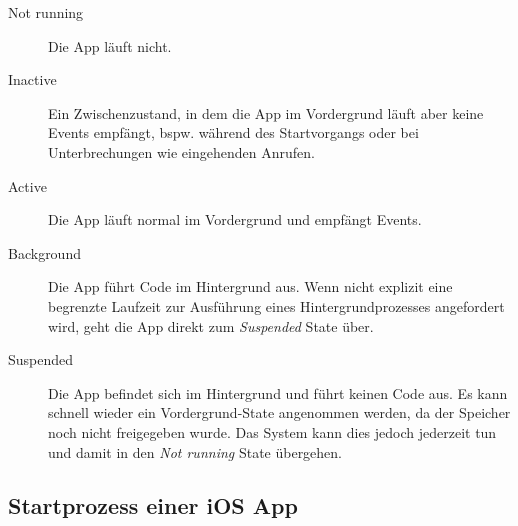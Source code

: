 \documentclass[parskip=half, final]{scrreprt}
\begin{document}
\begin{description}
\item[Not running] Die App läuft nicht.
\item[Inactive] Ein Zwischenzustand, in dem die App im Vordergrund läuft aber keine Events empfängt, bspw. während des Startvorgangs oder bei Unterbrechungen wie eingehenden Anrufen.
\item[Active] Die App läuft normal im Vordergrund und empfängt Events.
\item[Background] Die App führt Code im Hintergrund aus. Wenn nicht explizit eine begrenzte Laufzeit zur Ausführung eines Hintergrundprozesses angefordert wird, geht die App direkt zum \emph{Suspended} State über.
\item [Suspended] Die App befindet sich im Hintergrund und führt keinen Code aus. Es kann schnell wieder ein Vordergrund-State angenommen werden, da der Speicher noch nicht freigegeben wurde. Das System kann dies jedoch jederzeit tun und damit in den \emph{Not running} State übergehen.
\end{description}

\subsection{Startprozess einer iOS App}\label{sec:launchprocess}
\end{document}
